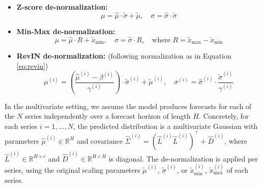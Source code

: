 \documentclass[a4paper,oneside,bibliography=totoc]{scrbook}
\begin{document}
\begin{itemize}
    \item \textbf{Z-score de-normalization:}
    \begin{equation}
    \mu = \hat{\mu} \cdot \tilde{\sigma} + \tilde{\mu}, \quad \sigma = \hat{\sigma} \cdot \tilde{\sigma}
    \end{equation}
    \item \textbf{Min-Max de-normalization:}
    \begin{equation}
    \mu = \hat{\mu}\cdot R + \tilde{x}_{\min}, \quad \sigma = \hat{\sigma} \cdot R, \quad \text{where } R = \tilde{x}_{\max} - \tilde{x}_{\min}
    \end{equation}
     \item \textbf{RevIN de-normalization:} (following normalization as in Equation \ref{eq:revin}) 
    \begin{equation}
    \mu^{(i)} = \left( \frac{\hat{\mu}^{(i)} - \beta^{(i)}}{\gamma^{(i)}} \right) \cdot \tilde{\sigma}^{(i)} + \tilde{\mu}^{(i)}, \quad 
    \sigma^{(i)} = \hat{\sigma}^{(i)} \cdot \frac{\tilde{\sigma}^{(i)}}{\gamma^{(i)}}
    \end{equation}
\end{itemize}
In the multivariate setting, we assume the model produces forecasts for each of the \( N \) series independently over a forecast horizon of length \( H \). Concretely, for each series \( i = 1, \dots, N \), the predicted distribution is a multivariate Gaussian with parameters \( \hat{\mu}^{(i)} \in \mathbb{R}^H \) and covariance \( \hat{\Sigma}^{(i)} = ( \hat{L}^{(i)} \hat{L}^{(i)})^\top + \hat{D}^{(i)} \), where \( \hat{L}^{(i)} \in \mathbb{R}^{H \times r} \) and \( \hat{D}^{(i)} \in \mathbb{R}^{H \times H} \) is diagonal.
The de-normalization is applied per series, using the original scaling parameters \( \tilde{\mu}^{(i)} \), \( \tilde{\sigma}^{(i)} \), or \( \tilde{x}_{\min}^{(i)} \), \( \tilde{x}_{\max}^{(i)} \) of each series.
\\
\end{document}
